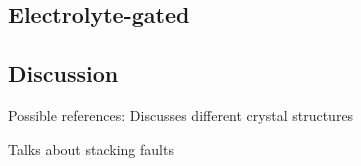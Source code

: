 \subsection{Electrolyte-gated \rucl}

\subsection{Discussion}


Possible references:
Discusses different crystal structures

Talks about stacking faults

\nocite{*}